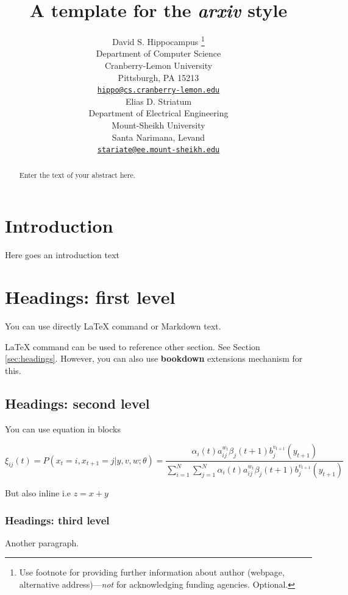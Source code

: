 \documentclass{article}
\title{A template for the \emph{arxiv} style}
\author{
    David S. Hippocampus
    \thanks{Use footnote for providing further information about author
(webpage, alternative address)---\emph{not} for acknowledging funding
agencies. Optional.}
   \\
    Department of Computer Science \\
    Cranberry-Lemon University \\
  Pittsburgh, PA 15213 \\
  \texttt{\href{mailto:hippo@cs.cranberry-lemon.edu}{\nolinkurl{hippo@cs.cranberry-lemon.edu}}} \\
   \And
    Elias D. Striatum
   \\
    Department of Electrical Engineering \\
    Mount-Sheikh University \\
  Santa Narimana, Levand \\
  \texttt{\href{mailto:stariate@ee.mount-sheikh.edu}{\nolinkurl{stariate@ee.mount-sheikh.edu}}} \\
  }
\begin{document}
\maketitle


\begin{abstract}
Enter the text of your abstract here.
\end{abstract}


\hypertarget{introduction}{%
\section{Introduction}\label{introduction}}

Here goes an introduction text

\hypertarget{headings-first-level}{%
\section{Headings: first level}\label{headings-first-level}}

\label{sec:headings}

You can use directly LaTeX command or Markdown text.

LaTeX command can be used to reference other section. See Section
\ref{sec:headings}. However, you can also use \textbf{bookdown}
extensions mechanism for this.

\hypertarget{headings-second-level}{%
\subsection{Headings: second level}\label{headings-second-level}}

You can use equation in blocks

\[
\xi _{ij}(t)=P(x_{t}=i,x_{t+1}=j|y,v,w;\theta)= {\frac {\alpha _{i}(t)a^{w_t}_{ij}\beta _{j}(t+1)b^{v_{t+1}}_{j}(y_{t+1})}{\sum _{i=1}^{N} \sum _{j=1}^{N} \alpha _{i}(t)a^{w_t}_{ij}\beta _{j}(t+1)b^{v_{t+1}}_{j}(y_{t+1})}}
\]

But also inline i.e \(z=x+y\)

\hypertarget{headings-third-level}{%
\subsubsection{Headings: third level}\label{headings-third-level}}

Another paragraph.
\end{document}
